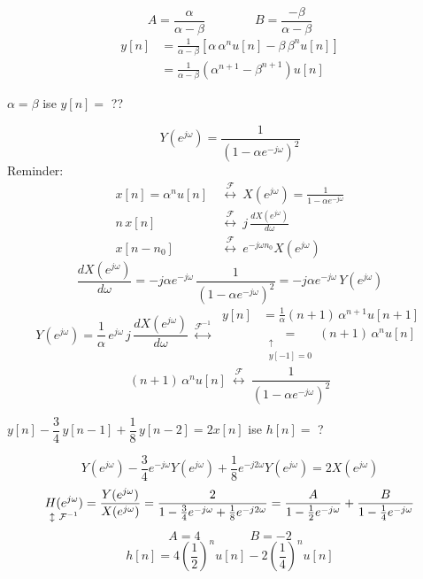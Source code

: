 \documentclass[11pt,a4paper]{article}
\begin{document}
\nopagebreak
\[ A=\frac{\alpha}{\alpha-\beta}\qquad\qquad B=\frac{-\beta}{\alpha-\beta} \]
\begin{align*}
  y[n] &=\frac{1}{\alpha-\beta}\left[\alpha\,\alpha^n u[n]-\beta\,\beta^n u[n]\right]\\
  &=\frac{1}{\alpha-\beta}\left(\alpha^{n+1}-\beta^{n+1}\right)u[n]
\end{align*}
\begin{ornek}
  $\alpha=\beta$ ise $y[n]=$ ??
\end{ornek}\nopagebreak
\[ Y(e^{j\omega})=\frac{1}{(1-\alpha e^{-j\omega})^2} \]
Reminder:
\begin{align*}
  x[n]=\alpha^n u[n]\ &\overset{\mathcal{F}}{\longleftrightarrow}\ X(e^{j\omega})=\frac{1}{1-\alpha e^{-j\omega}}\\
  n\,x[n]\ &\overset{\mathcal{F}}{\longleftrightarrow}\ j\,\frac{dX(e^{j\omega})}{d\omega}\\
  x[n-n_0]\ &\overset{\mathcal{F}}{\longleftrightarrow}\ e^{-j\omega n_0}X(e^{j\omega})
\end{align*}
\[ \frac{dX(e^{j\omega})}{d\omega}=-j\alpha e^{-j\omega}\,\frac{1}{(1-\alpha e^{-j\omega})^2}=-j\alpha e^{-j\omega}\,Y(e^{j\omega}) \]
\[ Y(e^{j\omega})=\frac{1}{\alpha}\,e^{j\omega}\,j\,\frac{dX(e^{j\omega})}{d\omega}\ \overset{\mathcal{F}^{-1}}{\longleftrightarrow}\ 
\begin{aligned}
  y[n]&=\frac{1}{\alpha}(n+1)\,\alpha^{n+1}u[n+1]\\
  &\underset{\substack{\uparrow\\ y[-1]=0}}{=}(n+1)\,\alpha^{n}u[n]
\end{aligned} \]
\[ (n+1)\,\alpha^n u[n]\ \overset{\mathcal{F}}{\longleftrightarrow}\ \frac{1}{(1-\alpha e^{-j\omega})^2} \]

\begin{ornek}
  $y[n]-\dfrac{3}{4}\,y[n-1]+\dfrac{1}{8}\,y[n-2]=2x[n]$ ise $h[n]=$ ?
\end{ornek}\nopagebreak
\[ Y(e^{j\omega})-\frac{3}{4}e^{-j\omega}Y(e^{j\omega})+\frac{1}{8}e^{-j2\omega}Y(e^{j\omega})=2X(e^{j\omega}) \]
\[ \underset{\mathclap{\updownarrow\ \mathcal{F}^{-1}}}{H(e^{j\omega})}=\frac{Y(e^{j\omega})}{X(e^{j\omega})}=\frac{2}{1-\frac{3}{4}e^{-j\omega}+\frac{1}{8}e^{-j2\omega}}=\frac{A}{1-\frac{1}{2}e^{-j\omega}}+\frac{B}{1-\frac{1}{4}e^{-j\omega}} \]
\[ A=4\qquad\qquad B=-2 \]
\[ h[n]=4\left(\frac{1}{2}\right)^{n}u[n]-2\left(\frac{1}{4}\right)^{n}u[n] \]

\nopagebreak
\end{document}
